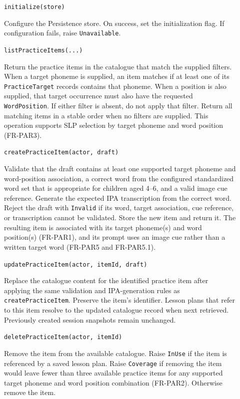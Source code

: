 \documentclass[12pt, titlepage]{article}
\begin{document}
\begin{description}
\item[] \texttt{initialize(store)}\par
Configure the Persistence store.
On success, set the initialization flag.
If configuration fails, raise \texttt{Unavailable}.

\item[] \texttt{listPracticeItems(...)}\par
Return the practice items in the catalogue that match the supplied filters.
When a target phoneme is supplied, an item matches if at least one of its
\texttt{PracticeTarget} records contains that phoneme. When a position is
also supplied, that target occurrence must also have the requested
\texttt{WordPosition}. If either filter is absent, do not apply that filter.
Return all matching items in a stable order when no filters are supplied.
This operation supports SLP selection by target phoneme and word position
(FR-PAR3).

\item[] \texttt{createPracticeItem(actor, draft)}\par
Validate that the draft contains at least one supported target phoneme and
word-position association, a correct word from the configured standardized
word set that is appropriate for children aged 4--6, and a valid image cue
reference. Generate the expected IPA
transcription from the correct word. Reject the draft with \texttt{Invalid}
if its word, target association, cue reference, or transcription cannot be
validated. Store the new item and return it. The resulting item is associated
with its target phoneme(s) and word position(s) (FR-PAR1), and its prompt
uses an image cue rather than a written target word (FR-PAR5 and FR-PAR5.1).

\item[] \texttt{updatePracticeItem(actor, itemId, draft)}\par
Replace the catalogue content for the identified practice item after applying
the same validation and IPA-generation rules as
\texttt{createPracticeItem}. Preserve the item's identifier. Lesson plans
that refer to this item resolve to the updated catalogue record when next
retrieved. Previously created session snapshots remain unchanged.

\item[] \texttt{deletePracticeItem(actor, itemId)}\par
Remove the item from the available catalogue. Raise \texttt{InUse} if the
item is referenced by a saved lesson plan. Raise
\texttt{Coverage} if removing the item would leave fewer than
three available practice items for any supported target phoneme and word
position combination (FR-PAR2). Otherwise remove the item.


\end{description}
\end{document}
